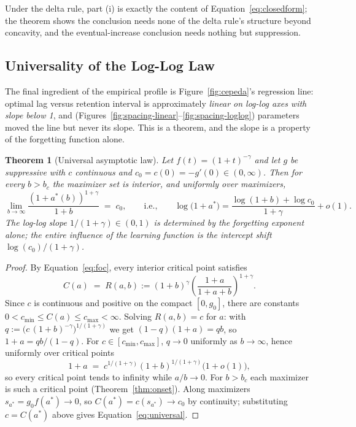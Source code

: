\documentclass[man, 12pt, floatsintext]{apa6}
\newtheorem{theorem}{Theorem}
\theoremstyle{definition}
\theoremstyle{remark}
\begin{document}
Under the delta rule, part (i) is exactly the content of Equation~\ref{eq:closedform}; the theorem shows the conclusion needs none of the delta rule's structure beyond concavity, and the eventual-increase conclusion needs nothing but suppression.

\subsection{Universality of the Log-Log Law}

The final ingredient of the empirical profile is Figure~\ref{fig:cepeda}'s regression line: optimal lag versus retention interval is approximately \emph{linear on log-log axes with slope below 1}, and (Figures~\ref{fig:spacing-linear}--\ref{fig:spacing-loglog}) parameters moved the line but never its slope. This is a theorem, and the slope is a property of the forgetting function alone.

\begin{theorem}[Universal asymptotic law]\label{thm:universal}
Let $f(t)=(1+t)^{-\gamma}$ and let $g$ be suppressive with $c$ continuous and $c_0 = c(0) = -g'(0) \in (0,\infty)$. Then for every $b > b_c$ the maximizer set is interior, and \emph{uniformly over maximizers},
\begin{equation}\label{eq:universal}
  \lim_{b\to\infty} \frac{(1+a^*(b))^{1+\gamma}}{1+b} \;=\; c_0,
  \qquad\text{i.e.,}\qquad
  \log\big(1+a^*\big) = \frac{\log(1+b) + \log c_0}{1+\gamma} + o(1).
\end{equation}
The log-log slope $1/(1+\gamma) \in (0,1)$ is determined by the forgetting exponent alone; the entire influence of the learning function is the intercept shift $\log(c_0)/(1+\gamma)$.
\end{theorem}

\begin{proof}
By Equation~\ref{eq:foc}, every interior critical point satisfies
\begin{equation}\label{eq:Rdef}
  C(a) \;=\; R(a,b) := (1+b)^{\gamma}\left(\frac{1+a}{1+a+b}\right)^{1+\gamma}.
\end{equation}
Since $c$ is continuous and positive on the compact $[0,g_0]$, there are constants $0 < c_{\min} \leq C(a) \leq c_{\max} < \infty$. Solving $R(a,b) = c$ for $a$: with $q := \big(c\,(1+b)^{-\gamma}\big)^{1/(1+\gamma)}$ we get $(1-q)(1+a) = qb$, so $1+a = qb/(1-q)$. For $c \in [c_{\min}, c_{\max}]$, $q \to 0$ uniformly as $b \to \infty$, hence uniformly over critical points
\begin{equation}
  1 + a \;=\; c^{1/(1+\gamma)} (1+b)^{1/(1+\gamma)}\big(1+o(1)\big),
\end{equation}
so every critical point tends to infinity while $a/b \to 0$. For $b > b_c$ each maximizer is such a critical point (Theorem~\ref{thm:onset}). Along maximizers $s_{a^*} = g_0 f(a^*) \to 0$, so $C(a^*) = c(s_{a^*}) \to c_0$ by continuity; substituting $c = C(a^*)$ above gives Equation~\ref{eq:universal}.
\end{proof}
\end{document}
